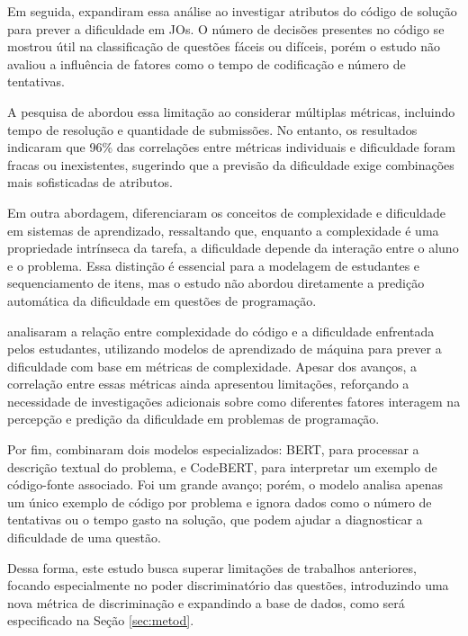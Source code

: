 \documentclass[12pt]{article}
\begin{document}
Em seguida, \cite{marcos2021} expandiram essa análise ao investigar atributos do código de solução para prever a dificuldade em JOs. O número de decisões presentes no código se mostrou útil na classificação de questões fáceis ou difíceis, porém o estudo não avaliou a influência de fatores como o tempo de codificação e número de tentativas.

A pesquisa de \cite{elrik2022} abordou essa limitação ao considerar múltiplas métricas, incluindo tempo de resolução e quantidade de submissões. No entanto, os resultados indicaram que 96\% das correlações entre métricas individuais e dificuldade foram fracas ou inexistentes, sugerindo que a previsão da dificuldade exige combinações mais sofisticadas de atributos.

Em outra abordagem, \cite{pelanek2022complexity} diferenciaram os conceitos de complexidade e dificuldade em sistemas de aprendizado, ressaltando que, enquanto a complexidade é uma propriedade intrínseca da tarefa, a dificuldade depende da interação entre o aluno e o problema. Essa distinção é essencial para a modelagem de estudantes e sequenciamento de itens, mas o estudo não abordou diretamente a predição automática da dificuldade em questões de programação.

\cite{jackson2023} analisaram a relação entre complexidade do código e a dificuldade enfrentada pelos estudantes, utilizando modelos de aprendizado de máquina para prever a dificuldade com base em métricas de complexidade. Apesar dos avanços, a correlação entre essas métricas ainda apresentou limitações, reforçando a necessidade de investigações adicionais sobre como diferentes fatores interagem na percepção e predição da dificuldade em problemas de programação.

Por fim, \cite{wang2024} combinaram dois modelos especializados: BERT, para processar a descrição textual do problema, e CodeBERT, para interpretar um exemplo de código-fonte associado. Foi um grande avanço; porém, o modelo analisa apenas um único exemplo de código por problema e ignora dados como o número de tentativas ou o tempo gasto na solução, que podem ajudar a diagnosticar a dificuldade de uma questão.

Dessa forma, este estudo busca superar limitações de trabalhos anteriores, focando especialmente no poder discriminatório das questões, introduzindo uma nova métrica de discriminação e expandindo a base de dados, como será especificado na Seção \ref{sec:metod}.
\end{document}
